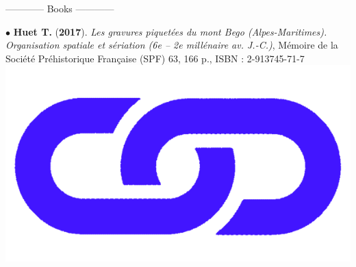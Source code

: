\documentclass{article}
\begin{document}
\begin{center}------------ Books ------------ \end{center}
\smallbreak
$\bullet$ \textbf{Huet T.} (\textbf{2017}). \textit{Les gravures piquet\'{e}es du mont Bego (Alpes-Maritimes). Organisation spatiale et s\'{e}riation (6e -- 2e mill\'{e}naire av. J.-C.)}, M\'{e}moire de la Soci\'{e}t\'{e} Pr\'{e}historique Fran\c{c}aise (SPF) 63, 166 p., ISBN : 2-913745-71-7 \href{http://www.prehistoire.org/shop_515-40342-0-0/m63-2017-les-gravures-piquetees-du-mont-bego-alpes-maritimes-organisation-spatiale-et-seriation-vie-iie-millenaire-av.-j.-c.-t.-huet.html}{\includegraphics[scale=0.02]{link_darkblue.png}}
\end{document}
